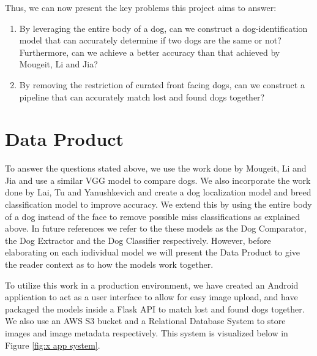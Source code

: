 \documentclass{article}
\begin{document}
Thus, we can now present the key problems this project aims to answer:

\begin{enumerate}
  \item By leveraging the entire body of a dog, can we construct a dog-identification model that can accurately determine if two dogs are the same or not?  Furthermore, can we achieve a better accuracy than that achieved by Mougeit, Li and Jia?
  \item By removing the restriction of curated front facing dogs, can we construct a pipeline that can accurately match lost and found dogs together? 
\end{enumerate}

\section{Data Product}

	To answer the questions stated above, we use the work done by Mougeit, Li and Jia and use a similar VGG model to compare dogs.  We also incorporate the work done by Lai, Tu and Yanushkevich and create a dog localization model and breed classification model to improve accuracy.   We extend this by using the entire body of a dog instead of the face to remove possible miss classifications as explained above.  In future references we refer to the these models as the Dog Comparator, the Dog Extractor and the Dog Classifier respectively.  However, before elaborating on each individual model we will present the Data Product to give the reader context as to how the models work together.

	To utilize this work in a production environment, we have created an Android application to act as a user interface to allow for easy image upload, and have packaged the models inside a Flask API to match lost and found dogs together. We also use an AWS S3 bucket and a Relational Database System to store images and image metadata respectively.  This system is visualized below in Figure \ref{fig:x app system}.
\end{document}
